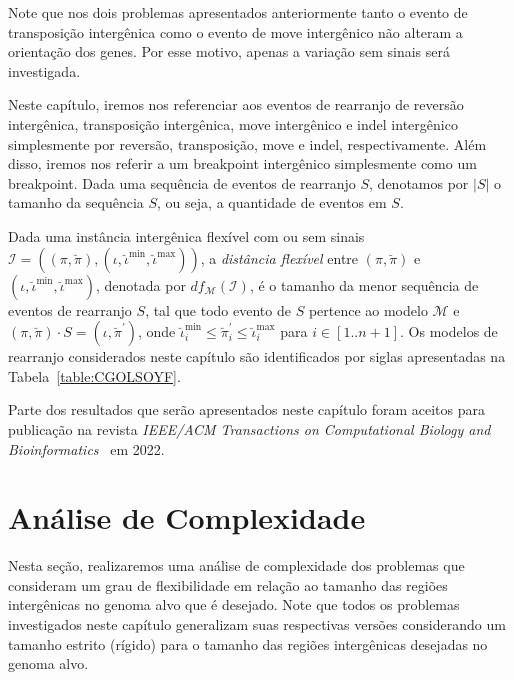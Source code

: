 Note que nos dois problemas apresentados anteriormente tanto o evento de transposição intergênica como o evento de move intergênico não alteram a orientação dos genes. Por esse motivo, apenas a variação sem sinais será investigada.

Neste capítulo, iremos nos referenciar aos eventos de rearranjo de reversão intergênica, transposição intergênica, move intergênico e indel intergênico simplesmente por reversão, transposição, move e indel, respectivamente. Além disso, iremos nos referir a um breakpoint intergênico simplesmente como um breakpoint. Dada uma sequência de eventos de rearranjo $S$, denotamos por $|S|$ o tamanho da sequência $S$, ou seja, a quantidade de eventos em $S$.

Dada uma instância intergênica flexível com ou sem sinais $\mathcal{I} = ((\pi,\breve\pi),(\iota,\breve\iota^{\min},\breve\iota^{\max}))$, a \emph{distância flexível} entre $(\pi,\breve\pi)$ e $(\iota,\breve\iota^{\min},\breve\iota^{\max})$, denotada por $df_{\mathcal{M}}(\mathcal{I})$, é o tamanho da menor sequência de eventos de rearranjo $S$, tal que todo evento de $S$ pertence ao modelo $\mathcal{M}$ e $(\pi,\breve\pi) \cdot S = (\iota,\breve\pi^{\prime})$, onde $\breve\iota^{\min}_i \le \breve\pi^{\prime}_i \le \breve\iota^{\max}_i$ para $i \in [1..n+1]$. Os modelos de rearranjo considerados neste capítulo são identificados por siglas apresentadas na Tabela~\ref{table:CGOLSOYF}.



Parte dos resultados que serão apresentados neste capítulo foram aceitos para publicação na revista \emph{IEEE/ACM Transactions on Computational Biology and Bioinformatics}~\cite{2022a-brito-etal} em 2022.

\section{Análise de Complexidade}

Nesta seção, realizaremos uma análise de complexidade dos problemas que consideram um grau de flexibilidade em relação ao tamanho das regiões intergênicas no genoma alvo que é desejado. Note que todos os problemas investigados neste capítulo generalizam suas respectivas versões considerando um tamanho estrito (rígido) para o tamanho das regiões intergênicas desejadas no genoma alvo.

